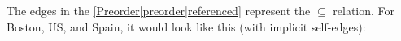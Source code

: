 The edges in the \ref{Preorder|preorder|referenced} represent the $\subseteq$ relation. For Boston, US, and Spain, it would look like this (with implicit self-edges): 
